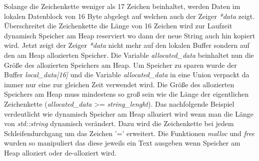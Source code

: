 \documentclass[MES,Master,ngerman]{twbook}%
\begin{document}
Solange die Zeichenkette weniger als 17 Zeichen beinhaltet, werden Daten im lokalen Datenblock von 16 Byte abgelegt auf welchen auch der Zeiger \textit{*data} zeigt. Überschreitet die Zeichenkette die Länge von 16 Zeichen wird zur Laufzeit dynamisch Speicher am Heap reserviert wo dann der neue String auch hin kopiert wird. Jetzt zeigt der Zeiger \textit{*data} nicht mehr auf den lokalen Buffer sondern auf den am Heap allozierten Speicher.
Die Variable \textit{allocated\_data} beinhaltet nun die Größe des allozierten Speichers am Heap. Um Speicher zu sparen wurde der Buffer \textit{local\_data[16]} und die Variable \textit{allocated\_data} in eine Union verpackt da immer nur eine zur gleichen Zeit verwendet wird. Die Größe des allozierten Speichers am Heap muss mindestens so groß sein wie die Länge der eigentlichen Zeichenkette (\textit{allocated\_data} >= \textit{string\_lenght}).\newline\newline
Das nachfolgende Beispiel verdeutlicht wie dynamisch Speicher am Heap alloziert wird wenn man die Länge von \textit{std::string} dynamisch verändert. Dazu wird die Zeichenkette bei jedem Schleifendurchgang um das Zeichen '=' erweitert. Die Funktionen \textit{malloc} und \textit{free} wurden so manipuliert das diese jeweils ein Text ausgeben wenn Speicher am Heap alloziert oder de-alloziert wird.
\end{document}
